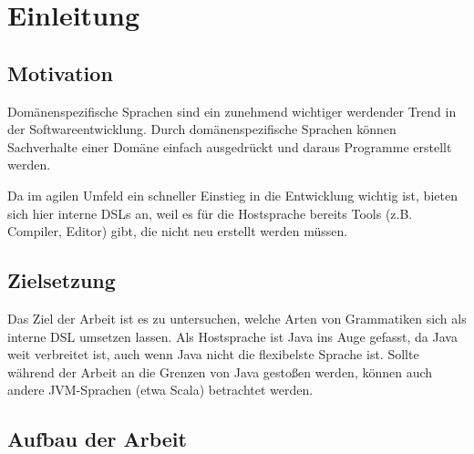 \documentclass[../InterneDSLs.tex]{subfiles}
\begin{document}
\chapter{Einleitung}


\section{Motivation}
Domänenspezifische Sprachen sind ein zunehmend wichtiger werdender Trend in der Softwareentwicklung. Durch domänenspezifische Sprachen können Sachverhalte einer Domäne einfach ausgedrückt und daraus Programme erstellt werden. 

Da im agilen Umfeld ein schneller Einstieg in die Entwicklung wichtig ist, bieten sich hier interne \acsp{DSL} an, weil es für die \Gls{Hostsprache} bereits Tools (z.B. Compiler, Editor) gibt, die nicht neu erstellt werden müssen.


\section{Zielsetzung}
Das Ziel der Arbeit ist es zu untersuchen, welche Arten von Grammatiken sich als interne DSL umsetzen lassen. Als Hostsprache ist Java ins Auge gefasst, da Java weit verbreitet ist, auch wenn Java nicht die flexibelste Sprache ist. Sollte während der Arbeit an die Grenzen von Java gestoßen werden, können auch andere \ac{JVM}-Sprachen (etwa Scala) betrachtet werden.

\section{Aufbau der Arbeit}
\end{document}

